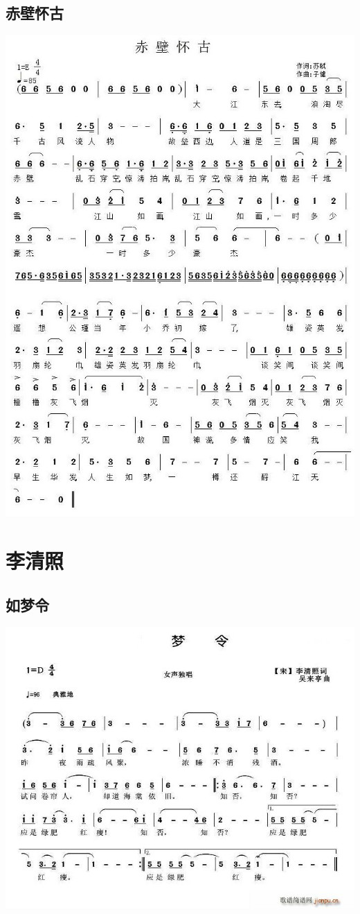 \documentclass[cn,pad,twocol]{elegantbook}
\begin{document}
\section{赤壁怀古}                  \includegraphics[width=\textwidth]{rpi400/20201230赤壁怀古.jpg}

\chapter{李清照}
\section{如梦令}        \includegraphics[width=\textwidth]{dongxiao/20200808-如梦令-李清照.jpg}
\end{document}
